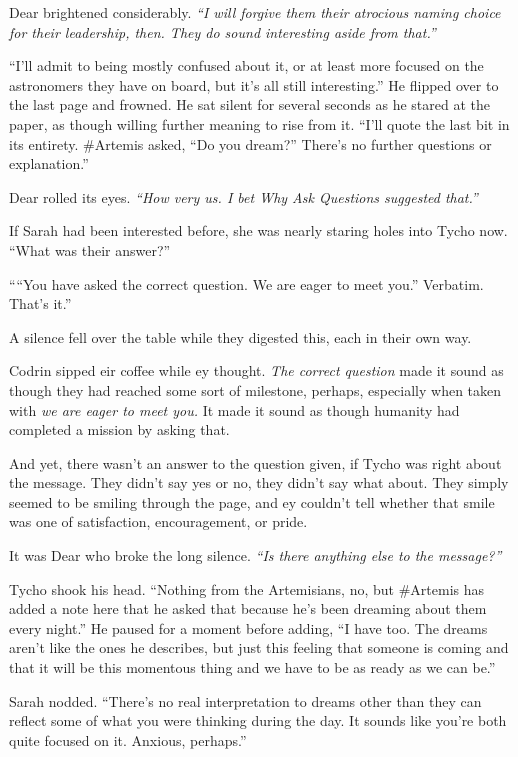 Dear brightened considerably. \emph{``I will forgive them their atrocious naming choice for their leadership, then. They do sound interesting aside from that.''}

``I'll admit to being mostly confused about it, or at least more focused on the astronomers they have on board, but it's all still interesting.'' He flipped over to the last page and frowned. He sat silent for several seconds as he stared at the paper, as though willing further meaning to rise from it. ``I'll quote the last bit in its entirety. \#Artemis asked, ``Do you dream?'' There's no further questions or explanation.''

Dear rolled its eyes. \emph{``How very us. I bet Why Ask Questions suggested that.''}

If Sarah had been interested before, she was nearly staring holes into Tycho now. ``What was their answer?''

````You have asked the correct question. We are eager to meet you.'' Verbatim. That's it.''

A silence fell over the table while they digested this, each in their own way.

Codrin sipped eir coffee while ey thought. \emph{The correct question} made it sound as though they had reached some sort of milestone, perhaps, especially when taken with \emph{we are eager to meet you.} It made it sound as though humanity had completed a mission by asking that.

And yet, there wasn't an answer to the question given, if Tycho was right about the message. They didn't say yes or no, they didn't say what about. They simply seemed to be smiling through the page, and ey couldn't tell whether that smile was one of satisfaction, encouragement, or pride.

It was Dear who broke the long silence. \emph{``Is there anything else to the message?''}

Tycho shook his head. ``Nothing from the Artemisians, no, but \#Artemis has added a note here that he asked that because he's been dreaming about them every night.'' He paused for a moment before adding, ``I have too. The dreams aren't like the ones he describes, but just this feeling that someone is coming and that it will be this momentous thing and we have to be as ready as we can be.''

Sarah nodded. ``There's no real interpretation to dreams other than they can reflect some of what you were thinking during the day. It sounds like you're both quite focused on it. Anxious, perhaps.''

